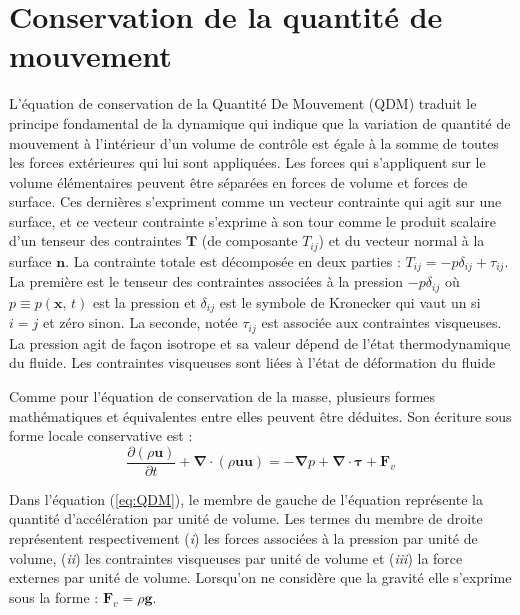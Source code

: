 \chapter{\label{sub:QDM}Conservation de la quantit\'e de mouvement}
L'\'equation de conservation de la Quantit\'e De Mouvement (QDM) traduit
le principe fondamental de la dynamique qui indique que la variation
de quantit\'e de mouvement \`a l'int\'erieur d'un volume de contr\^ole est
\'egale \`a la somme de toutes les forces ext\'erieures qui lui sont appliqu\'ees.
Les forces qui s'appliquent sur le volume \'el\'ementaires peuvent \^etre
s\'epar\'ees en forces de volume et forces de surface. Ces derni\`eres s'expriment
comme un vecteur contrainte qui agit sur une surface, et ce vecteur
contrainte s'exprime \`a son tour comme le produit scalaire d'un tenseur
des contraintes $\mathbf{T}$ (de composante $T_{ij}$) et du vecteur
normal \`a la surface $\mathbf{n}$. La contrainte totale est d\'ecompos\'ee
en deux parties : $T_{ij}=-p\delta_{ij}+\tau_{ij}$. La premi\`ere est
le tenseur des contraintes associ\'ees \`a la pression $-p\delta_{ij}$
o\`u $p\equiv p(\mathbf{x},\,t)$ est la pression et $\delta_{ij}$
est le symbole de Kronecker qui vaut un si $i=j$ et z\'ero sinon. La
seconde, not\'ee $\tau_{ij}$ est associ\'ee aux contraintes visqueuses.
La pression agit de fa\c con isotrope et sa valeur d\'epend de l'\'etat thermodynamique
du fluide. Les contraintes visqueuses sont li\'ees \`a l'\'etat de d\'eformation
du fluide

Comme pour l'\'equation de conservation de la masse, plusieurs formes
math\'ematiques et \'equivalentes entre elles peuvent \^etre d\'eduites. Son
\'ecriture sous forme locale conservative est :
\begin{equation}
\frac{\partial(\rho\mathbf{u})}{\partial t}+\boldsymbol{\nabla}\cdot(\rho\mathbf{u}\mathbf{u})=-\boldsymbol{\nabla}p+\boldsymbol{\nabla}\cdot\boldsymbol{\tau}+\mathbf{F}_{v}\label{eq:QDM}
\end{equation}


Dans l'\'equation (\ref{eq:QDM}), le membre de gauche de l'\'equation
repr\'esente la quantit\'e d'acc\'el\'eration par unit\'e de volume. Les termes
du membre de droite repr\'esentent respectivement (\emph{i}) les forces
associ\'ees \`a la pression par unit\'e de volume, (\emph{ii}) les contraintes
visqueuses par unit\'e de volume et (\emph{iii}) la force externes par
unit\'e de volume. Lorsqu'on ne consid\`ere que la gravit\'e elle s'exprime
sous la forme : $\mathbf{F}_{v}=\rho\mathbf{g}$.


